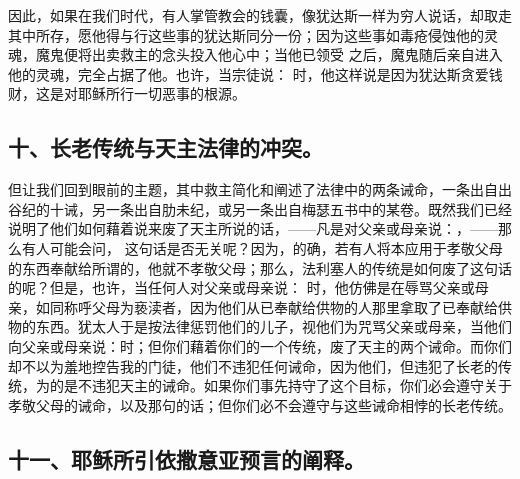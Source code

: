 因此，如果在我们时代，有人掌管教会的钱囊，像犹达斯一样为穷人说话，却取走其中所存，愿他得与行这些事的犹达斯同分一份；因为这些事如毒疮侵蚀他的灵魂，魔鬼便将出卖救主的念头投入他心中；当他已领受 之后，魔鬼随后亲自进入他的灵魂，完全占据了他。也许，当宗徒说： 时，他这样说是因为犹达斯贪爱钱财，这是对耶稣所行一切恶事的根源。\par


\subsection{十、长老传统与天主法律的冲突。}

但让我们回到眼前的主题，其中救主简化和阐述了法律中的两条诫命，一条出自出谷纪的十诫，另一条出自肋未纪，或另一条出自梅瑟五书中的某卷。既然我们已经说明了他们如何藉着说来废了天主所说的话，——凡是对父亲或母亲说：，——那么有人可能会问， 这句话是否无关呢？因为，的确，若有人将本应用于孝敬父母的东西奉献给所谓的，他就不孝敬父母；那么，法利塞人的传统是如何废了这句话的呢？但是，也许，当任何人对父亲或母亲说： 时，他仿佛是在辱骂父亲或母亲，如同称呼父母为亵渎者，因为他们从已奉献给供物的人那里拿取了已奉献给供物的东西。犹太人于是按法律惩罚他们的儿子，视他们为咒骂父亲或母亲，当他们向父亲或母亲说：时；但你们藉着你们的一个传统，废了天主的两个诫命。而你们却不以为羞地控告我的门徒，他们不违犯任何诫命，因为他们，但违犯了长老的传统，为的是不违犯天主的诫命。如果你们事先持守了这个目标，你们必会遵守关于孝敬父母的诫命，以及那句的话；但你们必不会遵守与这些诫命相悖的长老传统。\par


\subsection{十一、耶稣所引依撒意亚预言的阐释。}

